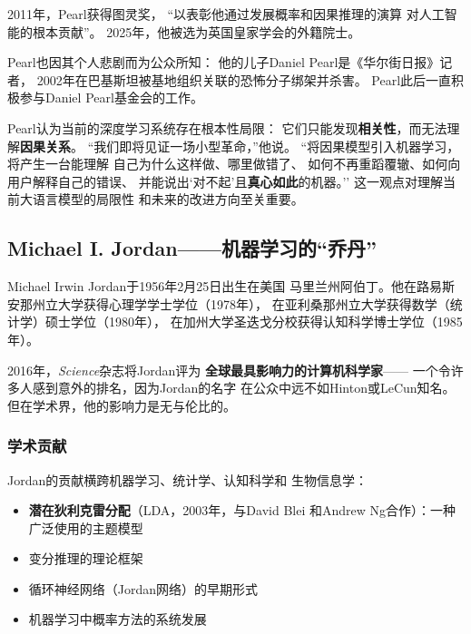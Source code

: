 2011年，Pearl获得图灵奖，
``以表彰他通过发展概率和因果推理的演算
对人工智能的根本贡献''。
2025年，他被选为英国皇家学会的外籍院士。

Pearl也因其个人悲剧而为公众所知：
他的儿子Daniel Pearl是《华尔街日报》记者，
2002年在巴基斯坦被基地组织关联的恐怖分子绑架并杀害。
Pearl此后一直积极参与Daniel Pearl基金会的工作。

\begin{corebox}
Pearl认为当前的深度学习系统存在根本性局限：
它们只能发现\textbf{相关性}，而无法理解\textbf{因果关系}。
``我们即将见证一场小型革命，''他说。
``将因果模型引入机器学习，将产生一台能理解
自己为什么这样做、哪里做错了、
如何不再重蹈覆辙、如何向用户解释自己的错误、
并能说出`对不起'且\textbf{真心如此}的机器。''
这一观点对理解当前大语言模型的局限性
和未来的改进方向至关重要。
\end{corebox}

\bigskip

\subsection{Michael I. Jordan——机器学习的``乔丹''}
\label{sec:michael-jordan}

Michael Irwin Jordan于1956年2月25日出生在美国
马里兰州阿伯丁。他在路易斯安那州立大学获得心理学学士学位（1978年），
在亚利桑那州立大学获得数学（统计学）硕士学位（1980年），
在加州大学圣迭戈分校获得认知科学博士学位（1985年）。

2016年，\textit{Science}杂志将Jordan评为
\textbf{全球最具影响力的计算机科学家}——
一个令许多人感到意外的排名，因为Jordan的名字
在公众中远不如Hinton或LeCun知名。
但在学术界，他的影响力是无与伦比的。

\subsubsection{学术贡献}
Jordan的贡献横跨机器学习、统计学、认知科学和
生物信息学：
\begin{itemize}[noitemsep]
  \item \textbf{潜在狄利克雷分配}（LDA，2003年，与David Blei
    和Andrew Ng合作）：一种广泛使用的主题模型
  \item 变分推理的理论框架
  \item 循环神经网络（Jordan网络）的早期形式
  \item 机器学习中概率方法的系统发展
\end{itemize}

